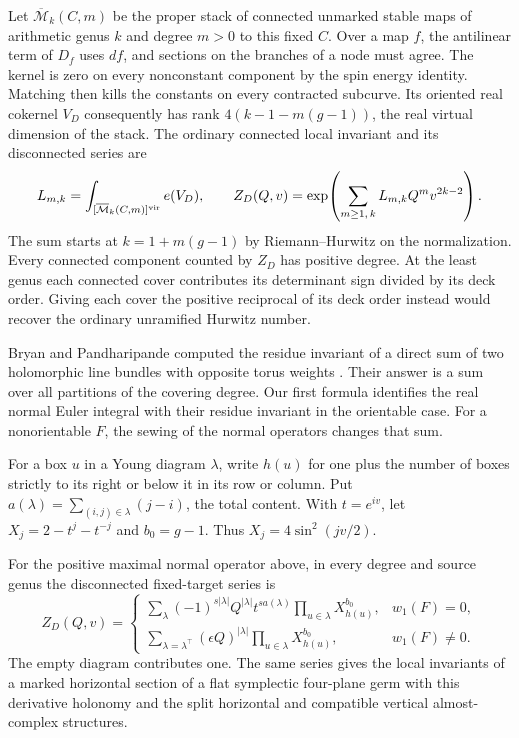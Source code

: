 Let \(\overline{\mathcal M}_k(C,m)\) be the proper stack of connected
unmarked stable maps of arithmetic genus \(k\) and degree \(m>0\) to
this fixed \(C\). Over a map \(f\), the antilinear term of \(D_f\)
uses \(df\), and sections on the branches of a node must agree.
The kernel is zero on every nonconstant component by the spin energy
identity. Matching then kills the constants on every contracted
subcurve. Its oriented real cokernel \(V_D\) consequently has rank
\(4(k-1-m(g-1))\), the real virtual dimension of the stack.
The ordinary connected local invariant and its disconnected series are
\begin{equation}\label{eq:fixed-target}
 L_{m,k}=\int_{[\overline{\mathcal M}_k(C,m)]^{\rm vir}}e(V_D),
 \qquad
 Z_D(Q,v)=\exp\!\left(\sum_{m\ge1,\,k}L_{m,k}Q^m v^{2k-2}\right).
\end{equation}
The sum starts at \(k=1+m(g-1)\) by Riemann--Hurwitz on the
normalization. Every connected component counted by \(Z_D\) has
positive degree. At the least genus each connected cover contributes its determinant sign divided by its deck order. Giving each cover the positive reciprocal of its deck order instead would recover the ordinary unramified Hurwitz number.

Bryan and Pandharipande computed the residue invariant of a direct sum
of two holomorphic line bundles with opposite torus weights
\cite[Corollaries~7.2--7.3]{bp08}. Their answer is a sum over all
partitions of the covering degree. Our first formula identifies the
real normal Euler integral with their residue invariant in the
orientable case. For a nonorientable \(F\), the sewing of the normal
operators changes that sum.

For a box \(u\) in a Young diagram \(\lambda\), write \(h(u)\) for
one plus the number of boxes strictly to its right or below it in its
row or column. Put \(a(\lambda)=\sum_{(i,j)\in\lambda}(j-i)\), the
total content. With \(t=e^{iv}\), let \(X_j=2-t^j-t^{-j}\) and
\(b_0=g-1\). Thus \(X_j=4\sin^2(jv/2)\).

\begin{theorem}\label{thm:spin}
For the positive maximal normal operator above, in every degree and
source genus the disconnected fixed-target series is
\[
 Z_D(Q,v)=
 \begin{cases}
 \displaystyle\sum_{\lambda}(-1)^{s|\lambda|}Q^{|\lambda|}
 t^{s a(\lambda)}\prod_{u\in\lambda}X_{h(u)}^{b_0},
       &w_1(F)=0,\\[5pt]
 \displaystyle\sum_{\lambda=\lambda^\top}(\epsilon Q)^{|\lambda|}
 \prod_{u\in\lambda}X_{h(u)}^{b_0},&w_1(F)\ne0.
 \end{cases}
\]
The empty diagram contributes one. The same series gives the local
invariants of a marked horizontal section of a flat symplectic
four-plane germ with this derivative holonomy and the split horizontal
and compatible vertical almost-complex structures.
\end{theorem}

